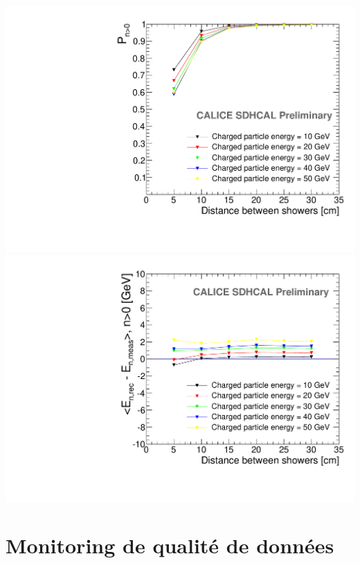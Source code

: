 \documentclass[8pt]{beamer}
\begin{document}
  \begin{frame}
  \frametitle{\secname}
  \framesubtitle{\subsecname}
    \begin{center}
      \includegraphics[width=0.48\linewidth]{OverlayEvent_NeutralPercentage.pdf}
      \includegraphics[width=0.48\linewidth]{OverlayEvent_NeutralEnergyDifferenceMeanNeutralEfficient.pdf}
    \end{center}
  \end{frame}
    
  \section{Monitoring de qualité de données}

  \begin{frame}
  \frametitle{\secname}
    \tableofcontents[currentsection]
  \end{frame}

\end{document}
